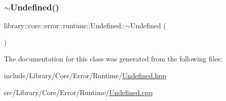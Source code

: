 \mbox{\label{classlibrary_1_1core_1_1error_1_1runtime_1_1_undefined_a9069574e62bbe7aabab0519b6052cb69}} 
\subsubsection{\texorpdfstring{$\sim$\+Undefined()}{~Undefined()}}
{\footnotesize\ttfamily library\+::core\+::error\+::runtime\+::\+Undefined\+::$\sim$\+Undefined (\begin{DoxyParamCaption}{ }\end{DoxyParamCaption})}



The documentation for this class was generated from the following files\+:\begin{DoxyCompactItemize}
\item 
include/\+Library/\+Core/\+Error/\+Runtime/\hyperlink{_undefined_8hpp}{Undefined.\+hpp}\item 
src/\+Library/\+Core/\+Error/\+Runtime/\hyperlink{_undefined_8cpp}{Undefined.\+cpp}\end{DoxyCompactItemize}
